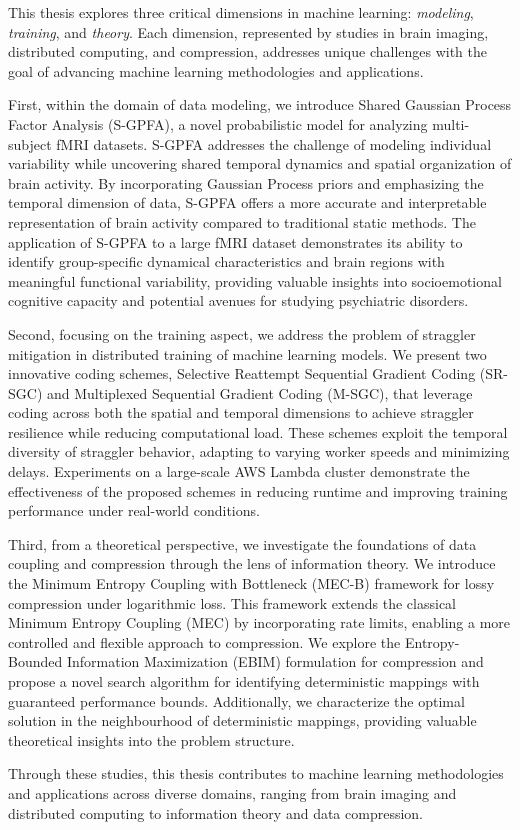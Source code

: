 \begin{spacing}{1.3}

This thesis explores three critical dimensions in machine learning: \textit{modeling}, \textit{training}, and \textit{theory}. Each dimension, represented by studies in brain imaging, distributed computing, and compression, addresses unique challenges with the goal of advancing machine learning methodologies and applications.

First, within the domain of data modeling, we introduce Shared Gaussian Process Factor Analysis (S-GPFA), a novel probabilistic model for analyzing multi-subject fMRI datasets. S-GPFA addresses the challenge of modeling individual variability while uncovering shared temporal dynamics and spatial organization of brain activity. By incorporating Gaussian Process priors and emphasizing the temporal dimension of data, S-GPFA offers a more accurate and interpretable representation of brain activity compared to traditional static methods. The application of S-GPFA to a large fMRI dataset demonstrates its ability to identify group-specific dynamical characteristics and brain regions with meaningful functional variability, providing valuable insights into socioemotional cognitive capacity and potential avenues for studying psychiatric disorders.

Second, focusing on the training aspect, we address the problem of straggler mitigation in distributed training of machine learning models. We present two innovative coding schemes, Selective Reattempt Sequential Gradient Coding (SR-SGC) and Multiplexed Sequential Gradient Coding (M-SGC), that leverage coding across both the spatial and temporal dimensions to achieve straggler resilience while reducing computational load. These schemes exploit the temporal diversity of straggler behavior, adapting to varying worker speeds and minimizing delays. Experiments on a large-scale AWS Lambda cluster demonstrate the effectiveness of the proposed schemes in reducing runtime and improving training performance under real-world conditions.

Third, from a theoretical perspective, we investigate the foundations of data coupling and compression through the lens of information theory. We introduce the Minimum Entropy Coupling with Bottleneck (MEC-B) framework for lossy compression under logarithmic loss. This framework extends the classical Minimum Entropy Coupling (MEC) by incorporating rate limits, enabling a more controlled and flexible approach to compression. We explore the Entropy-Bounded Information Maximization (EBIM) formulation for compression and propose a novel search algorithm for identifying deterministic mappings with guaranteed performance bounds. Additionally, we characterize the optimal solution in the neighbourhood of deterministic mappings, providing valuable theoretical insights into the problem structure. 

Through these studies, this thesis contributes to machine learning methodologies and applications across diverse domains, ranging from brain imaging and distributed computing to information theory and data compression. 

\end{spacing}